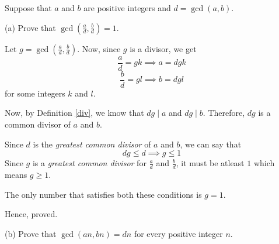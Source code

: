 \begin{problem}
	Suppose that $a$ and $b$ are positive integers and $d = \gcd(a, b)$.

	\bigbreak
	(a) Prove that $\gcd(\frac{a}{d}, \frac{b}{d}) = 1$.
	\begin{solution}
		Let $g = \gcd(\frac{a}{d}, \frac{b}{d})$. Now, since $g$ is a divisor, we get
		$$\frac{a}{d} = gk \implies a = dgk$$
		$$\frac{b}{d} = gl \implies b = dgl$$
		for some integers $k$ and $l$.

		Now, by Definition \ref{div}, we know that $dg \mid a$ and $dg \mid b$. Therefore, $dg$ is a common divisor of $a$ and $b$.

		Since $d$ is the \emph{greatest common divisor} of $a$ and $b$, we can say that 
		$$dg \leq d \implies g \leq 1$$
		Since $g$ is a \emph{greatest common divisor} for $\frac{a}{d}$ and $\frac{b}{d}$, it must be atleast $1$ which means $g \geq 1$.

		The only number that satisfies both these conditions is $g = 1$.

		Hence, proved.
	\end{solution}

	(b) Prove that $\gcd(an, bn) = dn$ for every positive integer $n$.
	\begin{solution}
		
	\end{solution}
\end{problem}

